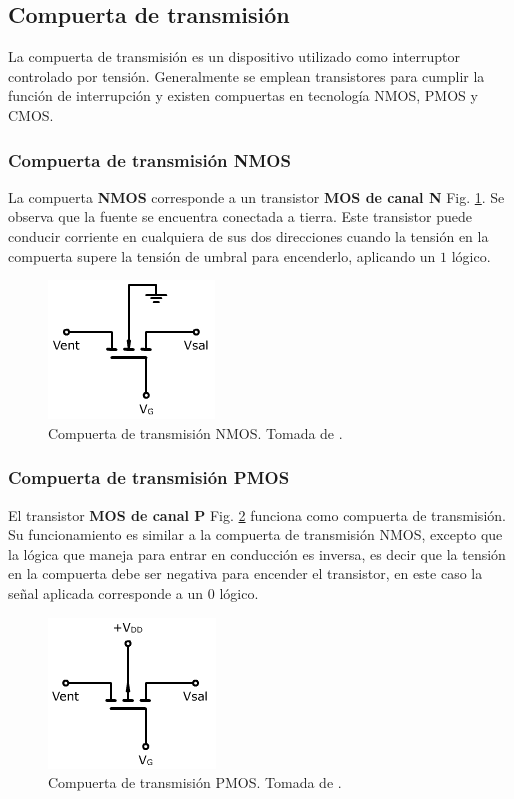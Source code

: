 \documentclass[twocolumn]{IEEEtran}
\begin{document}
\subsection{Compuerta de transmisión}
\noindent
La compuerta de transmisión es un dispositivo utilizado como interruptor controlado por tensión. Generalmente se emplean transistores para cumplir la función de interrupción y existen compuertas en tecnología NMOS, PMOS y CMOS.

\subsubsection{Compuerta de transmisión NMOS}
\noindent
La compuerta \textbf{NMOS} corresponde a un transistor \textbf{MOS de canal N} Fig. \ref{fig3}. Se observa que la fuente se encuentra conectada a tierra. Este transistor puede conducir corriente en cualquiera de sus dos direcciones cuando la tensión en la compuerta supere la tensión de umbral para encenderlo, aplicando un $1$ lógico.
\begin{figure}[H]
  \centering
    \includegraphics[scale=0.7]{fig3.png}
      \caption{Compuerta de transmisión NMOS. Tomada de \cite{page1}.}
	\label{fig3}
\end{figure}

\subsubsection{Compuerta de transmisión PMOS}
\noindent
El transistor \textbf{MOS de canal P} Fig. \ref{fig4} funciona como compuerta de transmisión. Su funcionamiento es similar a la compuerta de transmisión NMOS, excepto que la lógica que maneja para entrar en conducción es inversa, es decir que la tensión en la compuerta debe ser negativa para encender el transistor, en este caso la señal aplicada corresponde a un $0$ lógico.
\begin{figure}[H]
  \centering
    \includegraphics[scale=0.7]{fig4.png}
      \caption{Compuerta de transmisión PMOS. Tomada de \cite{page1}.}
	\label{fig4}
\end{figure}
\end{document}
